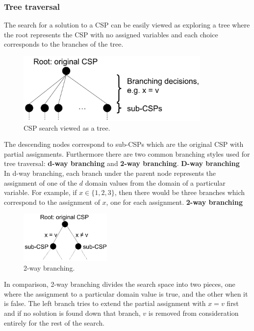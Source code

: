 \documentclass[CS4402-Notes.tex]{subfiles}
\begin{document}
\subsubsection{Tree traversal}
The search for a solution to a CSP can be easily viewed as exploring a tree where the root represents the CSP with no assigned variables and each choice corresponds to the branches of the tree. 
\begin{figure}[H]
\centering
\includegraphics[width=0.85\textwidth, keepaspectratio]{imgs/csp-tree.png}
\caption{CSP search viewed as a tree.}
\end{figure}
\noindent
The descending nodes correspond to sub-CSPs which are the original CSP with partial assignments. Furthermore there are two common branching styles used for tree traversal: \textbf{d-way branching} and \textbf{2-way branching}.
\n
\textbf{D-way branching} \\
In d-way branching, each branch under the parent node represents the assignment of one of the $d$ domain values from the domain of a particular variable. For example, if $x \in \{1, 2, 3\}$, then there would be three branches which correspond to the assignment of $x$, one for each assignment. 
\n
\textbf{2-way branching} \\
\begin{figure}[H]
\centering
\includegraphics[width=0.4\textwidth, keepaspectratio]{imgs/2-way-branching.png}
\caption{2-way branching.}
\end{figure}
\noindent
In comparison, 2-way branching divides the search space into two pieces, one where the assignment to a particular domain value is true, and the other when it is false. The left branch tries to extend the partial assignment with $x = v$ first and if no solution is found down that branch, $v$ is removed from consideration entirely for the rest of the search. 
\end{document}
